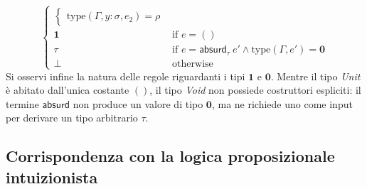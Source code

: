 \begin{equation}
\begin{cases}
\begin{cases}
                \text{type}(\Gamma, y:\sigma, e_2) = \rho 
            \end{cases}                                                                                                         \\
        \mathbf{1} & \text{if } e = ()                                                                      \\
        \tau       & \text{if } e = \mathsf{absurd}_{\tau} \ e' \land \text{type}(\Gamma, e') = \mathbf{0}  \\
        \perp      & \text{otherwise}
    \end{cases}
\end{equation}
Si osservi infine la natura delle regole riguardanti i tipi $\mathbf{1}$ e $\mathbf{0}$. Mentre il tipo \emph{Unit} è abitato dall'unica costante $()$, il tipo \emph{Void} 
non possiede costruttori espliciti: il termine $\mathsf{absurd}$ non produce un valore di tipo $\mathbf{0}$, ma ne richiede uno come input per derivare un tipo arbitrario $\tau$.

\subsection{Corrispondenza con la logica proposizionale intuizionista}